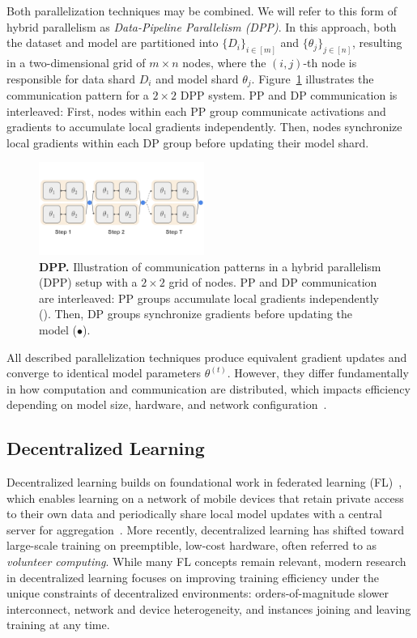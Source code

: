 \documentclass{article}
\newcommand{\orangebox}{\colorbox{oorange!50}{\hspace{0.3em}}}
\newcommand{\bluecircle}{\textcolor{bblue}{\LARGE$\bullet$}}
\begin{document}
Both parallelization techniques may be combined. We will refer to this form of hybrid parallelism as \textit{Data-Pipeline Parallelism (DPP)}. In this approach, both the dataset and model are partitioned into $\{D_i\}_{i \in [m]}$ and $\{\theta_j\}_{j \in [n]}$, resulting in a two-dimensional grid of $m \times n$ nodes, where the $(i,j)$-th node is responsible for data shard $D_i$ and model shard $\theta_j$. Figure~\ref{fig:dpp} illustrates the communication pattern for a $2\times 2$ DPP system. PP and DP communication is interleaved: First, nodes within each PP group communicate activations and gradients to accumulate local gradients independently. Then, nodes synchronize local gradients within each DP group before updating their model shard.

\begin{figure}[ht]
    \centering
    \vspace{0.5cm}
    \includegraphics[width=0.48\textwidth]{figures/dpp.pdf}
    \caption{\textbf{DPP.} Illustration of communication patterns in a hybrid parallelism (DPP) setup with a $2 \times 2$ grid of nodes. PP and DP communication are interleaved: PP groups accumulate local gradients independently (\orangebox). Then, DP groups synchronize gradients before updating the model (\bluecircle).}
    \label{fig:dpp}
\end{figure}

All described parallelization techniques produce equivalent gradient updates and converge to identical model parameters $\theta^{(t)}$. However, they differ fundamentally in how computation and communication are distributed, which impacts efficiency depending on model size, hardware, and network configuration~\cite{hagemann2024parallelization, fernandez2024scalingtrends}.

\subsection{Decentralized Learning}

Decentralized learning builds on foundational work in federated learning (FL)~\cite{mcmahan2016fl}, which enables learning on a network
of mobile devices that retain private access to their own data and periodically share local model updates with a central server for aggregation~\cite{mcmahan2016fl,wang2020fedma}. More recently, decentralized learning has shifted toward large-scale training on preemptible, low-cost hardware, often referred to as \textit{volunteer computing}. While many FL concepts remain relevant, modern research in decentralized learning focuses on improving training efficiency under the unique constraints of decentralized environments: orders-of-magnitude slower interconnect, network and device heterogeneity, and instances joining and leaving training at any time.
\end{document}
